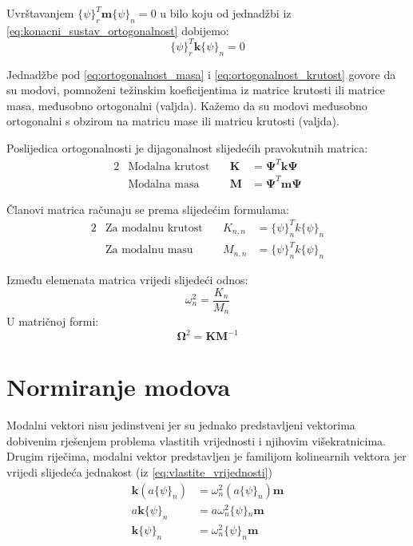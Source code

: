 \documentclass{rgn}
\newcommand\mm{\mathbf{m}}
\newcommand\kk{\mathbf{k}}
\newcommand\ppsi{\mathbf{\Psi}}
\newcommand\oomega{\mathbf{\Omega}}
\begin{document}
Uvrštavanjem $\{\psi\}_r^T\mm\{\psi\}_n=0$ u bilo koju od jednadžbi iz
\eqref{eq:konacni_sustav_ortogonalnost} dobijemo:
\begin{equation}\label{eq:ortogonalnost_krutost}
    \{\psi\}_r^T\kk\{\psi\}_n=0
\end{equation}

Jednadžbe pod \eqref{eq:ortogonalnost_masa} i \eqref{eq:ortogonalnost_krutost}
govore da su modovi, pomnoženi težinskim koeficijentima iz matrice krutosti ili
matrice masa, međusobno ortogonalni (valjda). Kažemo da su modovi međusobno ortogonalni s
obzirom na matricu mase ili matricu krutosti (valjda).
\par

Poslijedica ortogonalnosti je dijagonalnost slijedećih pravokutnih matrica:
\begin{alignat}{2}
    &\text{Modalna krutost}\quad & \mathbf{K}&=\ppsi^T\kk\ppsi\label{eq:modalna_krutost_matrica}\\
    &\text{Modalna masa}\quad &\mathbf{M}&=\ppsi^T\mm\ppsi\label{eq:modalna_masa_matrica}
\end{alignat}

Članovi matrica računaju se prema slijedećim formulama:
\begin{alignat}{2}
    &\text{Za modalnu krutost}\quad & K_{n,n}&=\{\psi\}_n^Tk\{\psi\}_n\label{eq:modalna_krutost}\\
    &\text{Za modalnu masu}\quad &M_{n,n}&=\{\psi\}_n^Tk\{\psi\}_n\label{eq:modalna_masa}
\end{alignat}

Između elemenata matrica vrijedi slijedeći odnos:
\begin{equation}
    \omega_n^2=\frac{K_n}{M_n}
\end{equation}
U matričnoj formi:
\begin{equation}
    \oomega^2=\mathbf{K}\mathbf{M}^{-1}
\end{equation}

\section{Normiranje modova}
Modalni vektori nisu jedinstveni jer su jednako predstavljeni vektorima dobivenim
rješenjem problema vlastitih vrijednosti i njihovim višekratnicima. Drugim riječima,
modalni vektor predstavljen je familijom kolinearnih vektora jer vrijedi slijedeća
jednakost (iz \eqref{eq:vlastite_vrijednosti})
\[
    \begin{aligned}
        \kk(a\{\psi\}_n)&=\omega_n^2(a\{\psi\}_n)\mm\\
        a\kk\{\psi\}_n&=a\omega_n^2\{\psi\}{}_n\mm\\
        \kk\{\psi\}_n&=\omega_n^2\{\psi\}_n\mm
    \end{aligned}
\]
\end{document}
